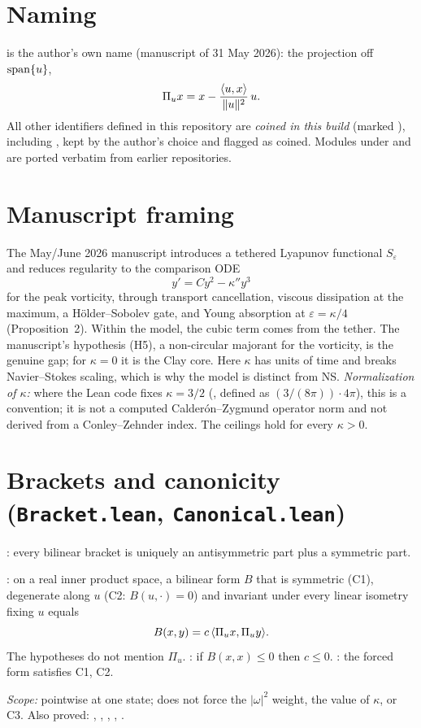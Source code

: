 \documentclass[11pt]{article}
\begin{document}
\section{Naming}
 is the author's own name (manuscript of 31 May 2026): the projection off $\operatorname{span}\{u\}$,
\begin{equation}\label{eq:Piu}\Pi_u x = x-\frac{\langle u,x\rangle}{\lVert u\rVert^2}\,u.\end{equation} All other identifiers defined in this repository are \emph{coined in this build} (marked \coined), including , kept by the author's choice and flagged as coined. Modules under  and  are ported verbatim from earlier repositories.
\section{Manuscript framing}
The May/June 2026 manuscript introduces a tethered Lyapunov functional $S_\varepsilon$ and reduces regularity to the comparison ODE
\begin{equation}\label{eq:cmp}y'=Cy^2-\kappa''y^3\end{equation}
for the peak vorticity, through transport cancellation, viscous dissipation at the maximum, a H\"older--Sobolev gate, and Young absorption at $\varepsilon=\kappa/4$ (Proposition~2). Within the model, the cubic term comes from the tether. The manuscript's hypothesis (H5), a non-circular majorant for the vorticity, is the genuine gap; for $\kappa=0$ it is the Clay core. Here $\kappa$ has units of time and breaks Navier--Stokes scaling, which is why the model is distinct from NS. \emph{Normalization of $\kappa$:} where the Lean code fixes $\kappa=3/2$ (, defined as $(3/(8\pi))\cdot4\pi$), this is a convention; it is not a computed Calder\'on--Zygmund operator norm and not derived from a Conley--Zehnder index. The ceilings hold for every $\kappa>0$.
\section{Brackets and canonicity (\texttt{Bracket.lean}, \texttt{Canonical.lean})}\label{sec:brackets}
\begin{theorem}\coined: every bilinear bracket is uniquely an antisymmetric part plus a symmetric part.\end{theorem}
\begin{theorem}\coined: on a real inner product space, a bilinear form $B$ that is symmetric (C1), degenerate along $u$ (C2: $B(u,\cdot)=0$) and invariant under every linear isometry fixing $u$ equals
\[B(x,y)=c\,\langle\Pi_u x,\Pi_u y\rangle.\] The hypotheses do not mention $\Pi_u$. \coined: if $B(x,x)\le0$ then $c\le0$. \coined: the forced form satisfies C1, C2.\end{theorem}
\noindent\emph{Scope:} pointwise at one state; does not force the $|\omega|^2$ weight, the value of $\kappa$, or C3. Also proved: , , , , \coined.
\end{document}

